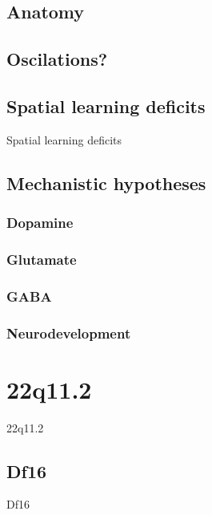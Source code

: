 \subsection{Anatomy}

\subsection{Oscilations?}

\subsection{Spatial learning deficits}
Spatial learning deficits

\subsection{Mechanistic hypotheses}
\subsubsection{Dopamine}
\subsubsection{Glutamate}
\subsubsection{GABA}
\subsubsection{Neurodevelopment}

\section{22q11.2}
22q11.2
\subsection{Df16}
Df16